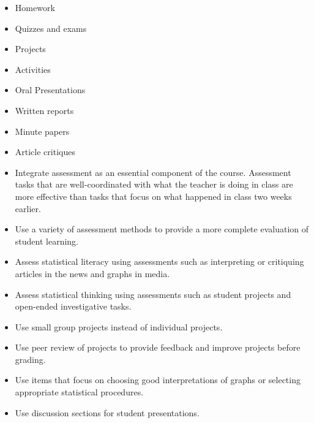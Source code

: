 \documentclass[twoside,openany]{tufte-book}
\begin{document}
\vspace{.2in}
 
\noindent{}
\begin{itemize}[leftmargin=1cm, itemsep=.2em]
\item Homework
\item Quizzes and exams
\item Projects
\item Activities
\item Oral Presentations
\item Written reports
\item Minute papers 
\item Article critiques
\end{itemize} 

 \vspace{.2in}
\noindent{}

\renewcommand{\labelitemi}{$\checkmark$}

\begin{itemize}[leftmargin=1cm, itemsep=.2em]
\item Integrate assessment as an essential component of the course. Assessment tasks that are well-coordinated with what the teacher is doing in class are more effective than tasks that focus on what happened in class two weeks earlier.
\item Use a variety of assessment methods to provide a more complete evaluation of student learning.
\item Assess statistical literacy using assessments such as interpreting or critiquing articles in the news and graphs in media.
\item Assess statistical thinking using assessments such as student projects and open-ended investigative tasks.
\end{itemize}
 
 \vspace{.2in}
\noindent{}
\begin{itemize}[leftmargin=1cm, itemsep=.2em]
\item Use small group projects instead of individual projects.
\item Use peer review of projects to provide feedback and improve projects before grading.
\item Use items that focus on choosing good interpretations of graphs or selecting appropriate statistical procedures.
\item Use discussion sections for student presentations.
\end{itemize}
\end{document}
